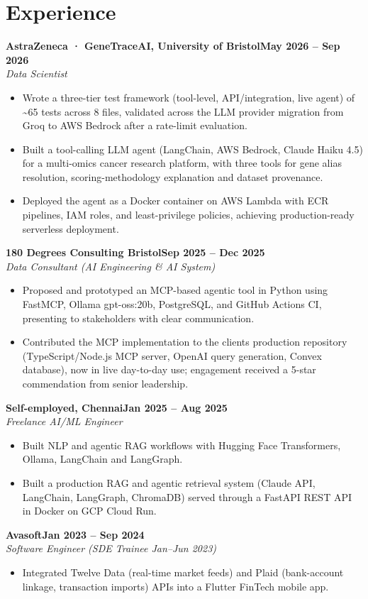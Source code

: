 \documentclass[a4paper,10pt]{article}
\newcommand{\entry}[4]{\noindent\textbf{#1}\hfill\textbf{#2}\\ \textit{#3}\hfill\textit{#4}\par}
\begin{document}
\section{Experience}
\entry{AstraZeneca · GeneTraceAI, University of Bristol}{May 2026 – Sep 2026}{Data Scientist}{}
\begin{itemize}
  \item Wrote a three-tier test framework (tool-level, API/integration, live agent) of \textasciitilde{}65 tests across 8 files, validated across the LLM provider migration from Groq to AWS Bedrock after a rate-limit evaluation.
  \item Built a tool-calling LLM agent (LangChain, AWS Bedrock, Claude Haiku 4.5) for a multi-omics cancer research platform, with three tools for gene alias resolution, scoring-methodology explanation and dataset provenance.
  \item Deployed the agent as a Docker container on AWS Lambda with ECR pipelines, IAM roles, and least-privilege policies, achieving production-ready serverless deployment.
\end{itemize}
\vspace{3pt}
\entry{180 Degrees Consulting Bristol}{Sep 2025 – Dec 2025}{Data Consultant (AI Engineering \& AI System)}{}
\begin{itemize}
  \item Proposed and prototyped an MCP-based agentic tool in Python using FastMCP, Ollama gpt-oss:20b, PostgreSQL, and GitHub Actions CI, presenting to stakeholders with clear communication.
  \item Contributed the MCP implementation to the client\textquotesingle{}s production repository (TypeScript/Node.js MCP server, OpenAI query generation, Convex database), now in live day-to-day use; engagement received a 5-star commendation from senior leadership.
\end{itemize}
\vspace{3pt}
\entry{Self-employed, Chennai}{Jan 2025 – Aug 2025}{Freelance AI/ML Engineer}{}
\begin{itemize}
  \item Built NLP and agentic RAG workflows with Hugging Face Transformers, Ollama, LangChain and LangGraph.
  \item Built a production RAG and agentic retrieval system (Claude API, LangChain, LangGraph, ChromaDB) served through a FastAPI REST API in Docker on GCP Cloud Run.
\end{itemize}
\vspace{3pt}
\entry{Avasoft}{Jan 2023 – Sep 2024}{Software Engineer (SDE Trainee Jan–Jun 2023)}{}
\begin{itemize}
  \item Integrated Twelve Data (real-time market feeds) and Plaid (bank-account linkage, transaction imports) APIs into a Flutter FinTech mobile app.
\end{itemize}
\end{document}
